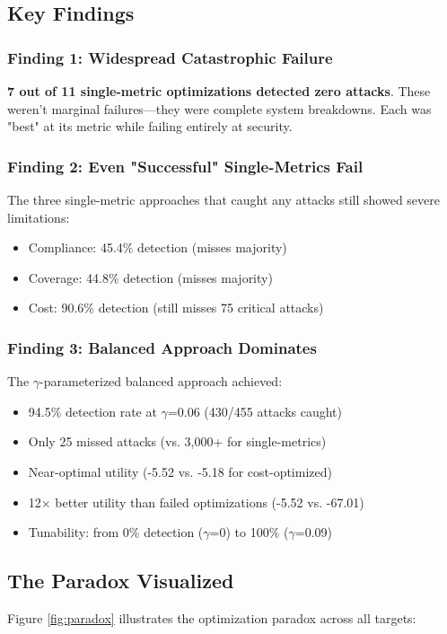 \documentclass[11pt]{article}
\begin{document}
\subsection{Key Findings}

\subsubsection{Finding 1: Widespread Catastrophic Failure}
\textbf{7 out of 11 single-metric optimizations detected zero attacks}. These weren't marginal failures—they were complete system breakdowns. Each was "best" at its metric while failing entirely at security.

\subsubsection{Finding 2: Even "Successful" Single-Metrics Fail}
The three single-metric approaches that caught any attacks still showed severe limitations:
\begin{itemize}
\item Compliance: 45.4\% detection (misses majority)
\item Coverage: 44.8\% detection (misses majority)
\item Cost: 90.6\% detection (still misses 75 critical attacks)
\end{itemize}

\subsubsection{Finding 3: Balanced Approach Dominates}
The $\gamma$-parameterized balanced approach achieved:
\begin{itemize}
\item 94.5\% detection rate at $\gamma$=0.06 (430/455 attacks caught)
\item Only 25 missed attacks (vs. 3,000+ for single-metrics)
\item Near-optimal utility (-5.52 vs. -5.18 for cost-optimized)
\item 12× better utility than failed optimizations (-5.52 vs. -67.01)
\item Tunability: from 0\% detection ($\gamma$=0) to 100\% ($\gamma$=0.09)
\end{itemize}

\subsection{The Paradox Visualized}
Figure \ref{fig:paradox} illustrates the optimization paradox across all targets:
\end{document}
